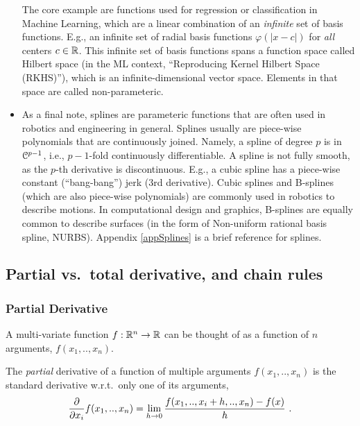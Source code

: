 \begin{itemize}
The core example are functions used for regression or classification in Machine Learning, which are a linear combination of an \emph{infinite} set of basis functions. E.g., an infinite set of radial basis functions $\varphi(|x-c|)$ for \emph{all} centers $c \in {\mathbb{R}}$. This infinite set of basis functions spans a function space called Hilbert space (in the ML context, ``Reproducing Kernel Hilbert Space (RKHS)''), which is an infinite-dimensional vector space. Elements in that space are called non-parameteric.

\item As a final note, splines are parameteric functions that are often used in robotics and engineering in general. Splines usually are piece-wise polynomials that are continuously joined. Namely, a spline of degree $p$ is in ${\cal C}^{p-1}$, i.e., $p-1$-fold continuously differentiable. A spline is not fully smooth, as the $p$-th derivative is discontinuous. E.g., a cubic spline has a piece-wise constant (``bang-bang'') jerk (3rd derivative). Cubic splines and B-splines (which are also piece-wise polynomials) are commonly used in robotics to describe motions. In computational design and graphics, B-splines are equally common to describe surfaces (in the form of Non-uniform rational basis spline, NURBS). Appendix \ref{appSplines} is a brief reference for splines.
\end{itemize}


\subsection{Partial vs.\ total derivative, and chain rules}

\subsubsection{Partial Derivative}

A multi-variate function $f: {\mathbb{R}}^n \to {\mathbb{R}}$ can be thought of
as a function of $n$ arguments, $f(x_1,..,x_n)$.

\begin{myDefinition}
The \emph{partial} derivative of a function of multiple arguments
$f(x_1,..,x_n)$ is the standard derivative w.r.t.\ only one of its arguments,
\begin{equation}
\frac{\partial}{\partial x_i} f(x_1,..,x_n) = \lim_{h\to
0} \frac{f(x_1,..,x_i+h,..,x_n)-f(x)}{h} ~.
\end{equation}
\end{myDefinition}



